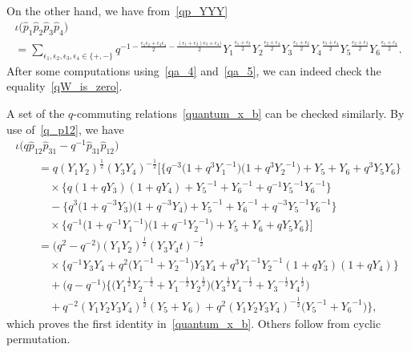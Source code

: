 \documentclass[10pt,a4paper]{amsart}
\numberwithin{equation}{section}
\begin{document}
On the other hand, we have from~\eqref{qp_YYY}
\begin{gather}
 \iota \big( \hat{p}_1 \hat{p}_2 \hat{p}_3 \hat{p}_4 \big) \label{qa_5}\\
 = \sum_{ \epsilon_1, \epsilon_2, \epsilon_3, \epsilon_4 \in \{+, -\} } q^{-1 - \frac{ \epsilon_1 \epsilon_2 + \epsilon_3 \epsilon_4 }{2} -\frac{( \epsilon_1 + \epsilon_2)
 \epsilon_3+\epsilon_4) }{2} } {Y_1}^{\frac{\epsilon_1+\epsilon_3}{2}} {Y_2}^{\frac{\epsilon_2+\epsilon_4}{2}} {Y_3}^{\frac{\epsilon_1+\epsilon_2}{2}} {Y_4}^{\frac{\epsilon_3+\epsilon_4}{2}}
 {Y_5}^{\frac{\epsilon_2+\epsilon_3}{2}} {Y_6}^{\frac{\epsilon_1+\epsilon_4}{2}} .\nonumber
\end{gather}
After some computations using~\eqref{qa_4} and~\eqref{qa_5}, we can indeed check the equality~\eqref{qW_is_zero}.

A set of the $q$-commuting relations~\eqref{quantum_x_b} can be checked similarly. By use of~\eqref{q_p12}, we have
\begin{gather*}
 \iota \big( q \hat{p}_{12} \hat{p}_{31} - q^{-1} \hat{p}_{31} \hat{p}_{12}\big) \\
\qquad{} = q ( Y_1 Y_2 )^{\frac{1}{2}} ( Y_3 Y_4)^{-\frac{1}{2}} \big[\big\{ q^{-3}\big( 1 + q^3 {Y_1}^{-1}\big)\big( 1 + q^3 {Y_2}^{-1}\big) + Y_5 + Y_6 + q^3 Y_5 Y_6\big\} \\
 \qquad\quad {} \times \big\{ q ( 1 + q Y_3)( 1 + q Y_4) + {Y_5}^{-1} +{Y_6}^{-1} + q^{-1} {Y_5}^{-1} {Y_6}^{-1}\big\} \\
\qquad\quad {} - \big\{ q^3 \big( 1 + q^{-3} Y_3 \big)\big( 1+ q^{-3} Y_4\big) + {Y_5}^{-1} + {Y_6}^{-1}+ q^{-3} {Y_5}^{-1} {Y_6}^{-1} \big\} \\
\qquad\quad {} \times \big\{ q^{-1} \big( 1 +q^{-1} {Y_1}^{-1} \big) \big( 1 + q^{-1} {Y_2}^{-1} \big) + Y_5 + Y_6 + q Y_5 Y_6 \big\}\big] \\
 \qquad{} = \big(q^2 - q^{-2}\big)( Y_1 Y_2)^{\frac{1}{2}} ( Y_3 Y_4t)^{- \frac{1}{2}} \\
\qquad\quad {} \times \big\{ q^{-1} Y_3 Y_4 + q^2 \big( {Y_1}^{-1} + {Y_2}^{-1}\big) Y_3 Y_4 + q^3 {Y_1}^{-1} {Y_2}^{-1} ( 1+ q Y_3 ) ( 1 + q Y_4)\big\} \\
\qquad\quad {} + \big( q- q^{-1}\big) \big\{ \big( {Y_1}^{\frac{1}{2}} {Y_2}^{-\frac{1}{2}} + {Y_1}^{-\frac{1}{2}} {Y_2}^{\frac{1}{2}}\big) \big(
 {Y_3}^{\frac{1}{2}} {Y_4}^{-\frac{1}{2}} + {Y_3}^{-\frac{1}{2}} {Y_4}^{\frac{1}{2}} \big) \\
\qquad\quad {} +q^{-2} ( Y_1 Y_2 Y_3 Y_4 )^{\frac{1}{2}} ( Y_5 + Y_6 ) + q^2 ( Y_1 Y_2 Y_3 Y_4)^{-\frac{1}{2}} \big( {Y_5}^{-1} + {Y_6}^{-1}\big) \big\} ,
\end{gather*}
which proves the first identity in~\eqref{quantum_x_b}. Others follow from cyclic permutation.
\end{document}
